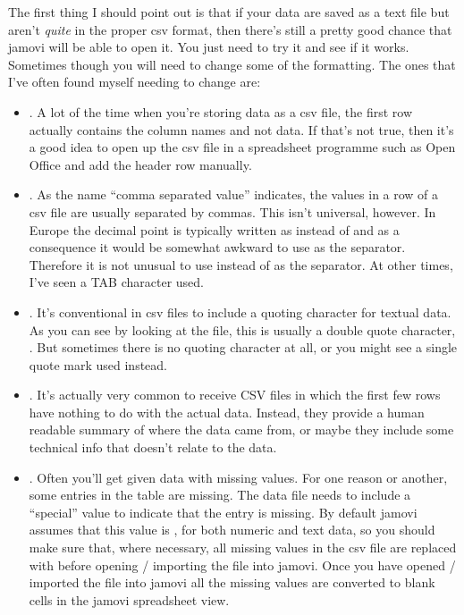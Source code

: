 The first thing I should point out is that if your data are saved as a text file but aren't {\it quite} in the proper csv format, then there's still a pretty good chance that jamovi will be able to open it. You just need to try it and see if it works. Sometimes though you will need to change some of the formatting. The ones that I've often found myself needing to change are:
\begin{itemize}
\item {}. A lot of the time when you're storing data as a csv file, the first row actually contains the column names and not data. If that's not true, then it's a good idea to open up the csv file in a spreadsheet programme such as Open Office and add the header row manually. 
\item {}. As the name ``comma separated value'' indicates, the values in a row of a csv file are usually separated by commas. This isn't universal, however. In Europe the decimal point is typically written as \rtext{,} instead of  and as a consequence it would be somewhat awkward to use \rtext{,} as the separator. Therefore it is not unusual to use \rtext{;} instead of \rtext{,} as the separator. At other times, I've seen a TAB character used. 
\item {}. It's conventional in csv files to include a quoting character for textual data. As you can see by looking at the  file, this is usually a double quote character, . But sometimes there is no quoting character at all, or you might see a single quote mark  used instead. 
\item {}. It's actually very common to receive CSV files in which the first few rows have nothing to do with the actual data. Instead, they provide a human readable summary of where the data came from, or maybe they include some technical info that doesn't relate to the data. 
\item {}. Often you'll get given data with missing values. For one reason or another, some entries in the table are missing. The data file needs to include a ``special'' value to indicate that the entry is missing. By default jamovi assumes that this value is , for both numeric and text data, so you should make sure that, where necessary, all missing values in the csv file are replaced with  before opening / importing the file into jamovi. Once you have opened / imported the file into jamovi all the  missing values are converted to blank cells in the jamovi spreadsheet view.
\end{itemize}


